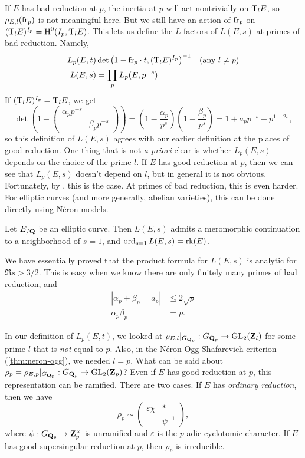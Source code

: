 If $E$ has bad reduction at $p$, the inertia at $p$ will act nontrivially 
on $\mathrm{T}_l E$, so $\rho_{E,l}(\mathrm{fr}_p)$ is not meaningful here. But we 
still have an action of $\mathrm{fr}_p$ on 
$(\mathrm{T}_l E)^{I_p} = \operatorname{H}^0(I_p,\mathrm{T}_l E)$. This lets us define the $L$-factors 
of $L(E,s)$ at primes of bad reduction. Namely, 
\begin{align*}
  L_p(E,t) & \det\left(1-\mathrm{fr}_p\cdot t, (\mathrm{T}_l E)^{I_p}\right)^{-1} && (\text{any }l\ne p)\\
  L(E,s) &= \prod_p L_p(E,p^{-s}) .
\end{align*}
If $(\mathrm{T}_l E)^{I_p}=\mathrm{T}_l E$, we get 
\[
  \det\left(1-\begin{pmatrix} \alpha_p p^{-s} \\ & \beta_p p^{-s} \end{pmatrix} \right) = \left(1-\frac{\alpha_p}{p^s}\right)\left(1-\frac{\beta_p}{p^s}\right) = 1 + a_p p^{-s} + p^{1-2 s} ,
\]
so this definition of $L(E,s)$ agrees with our earlier definition at the places 
of good reduction. One thing that is not \emph{a priori} clear is whether 
$L_p(E,s)$ depends on the choice of the prime $l$. If $E$ has good reduction at 
$p$, then we can see that $L_p(E,s)$ doesn't depend on $l$, but in general it 
is not obvious. Fortunately, by \cite[3.3.9]{deligne-1980}, this is the case. 
At primes of bad reduction, this is even harder. For elliptic curves (and more 
generally, abelian varieties), this can be done directly using N\'eron models. 

\begin{conjecture}
Let $E_{/\mathbf{Q}}$ be an elliptic curve. Then $L(E,s)$ admits a meromorphic 
continuation to a neighborhood of $s=1$, and 
$\operatorname{ord}_{s=1} L(E,s) = \operatorname{rk}(E)$. 
\end{conjecture}

We have essentially proved that the product formula for $L(E,s)$ is analytic 
for $\Re s>3/2$. This is easy when we know there are only finitely many 
primes of bad reduction, and 
\begin{align*}
  |\alpha_p+\beta_p=a_p| &\leqslant 2\sqrt p \\
  \alpha_p \beta_p &= p .
\end{align*}

In our definition of $L_p(E,t)$, we looked at 
$\rho_{E,l}|_{G_{\mathbf{Q}_p}}:G_{\mathbf{Q}_p}\to \operatorname{GL}_2(\mathbf{Z}_l)$ for some prime 
$l$ that is \emph{not} equal to $p$. Also, in the N\'eron-Ogg-Shafarevich 
criterion (\ref{thm:neron-ogg}), we needed $l=p$. What can be said about 
$\rho_p=\rho_{E,p}|_{G_{\mathbf{Q}_p}}:G_{\mathbf{Q}_p} \to \operatorname{GL}_2(\mathbf{Z}_p)$? Even if $E$ 
has good reduction at $p$, this representation can be ramified. 
There are two cases. If $E$ has \emph{ordinary reduction}, then we have 
\[
  \rho_p \sim \begin{pmatrix} \varepsilon \chi & \ast \\ & \psi^{-1} \end{pmatrix} ,
\]
where $\psi:G_{\mathbf{Q}_p}\to \mathbf{Z}_p^\times$ is unramified and 
$\varepsilon$ is the $p$-adic cyclotomic character.
If $E$ has good supersingular reduction at $p$, then $\rho_p$ is irreducible. 

